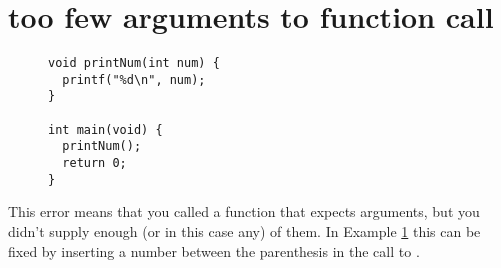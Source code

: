 \section{too few arguments to function call}\label{sec:missing-args}

\begin{figure}
\begin{lstlisting}
void printNum(int num) {
  printf("%d\n", num);
}

int main(void) {
  printNum();
  return 0;
}
\end{lstlisting}

\label{ex:missing-args}
\end{figure}

This error means that you called a function that expects arguments, but you didn't supply enough (or in this case any) of them.
In Example \ref{ex:missing-args} this can be fixed by inserting a number between the parenthesis in the call to .

\newpage